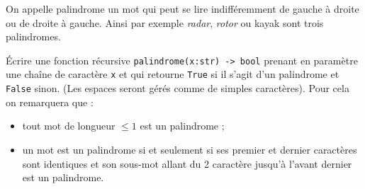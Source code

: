 On appelle palindrome un mot qui peut se lire indifféremment de gauche à droite ou de droite à gauche. Ainsi par exemple \textit{radar}, \textit{rotor} ou kayak sont trois palindromes.

\question{} Écrire une fonction récursive \texttt{palindrome(x:str) -> bool} prenant en paramètre une chaîne de caractère \texttt{x} et qui retourne \texttt{True} si il s'agit d'un palindrome et \texttt{False} sinon. (Les espaces seront gérés comme de simples caractères). Pour cela on remarquera que :
\begin{itemize}
\item tout mot de longueur $\leq 1$ est un palindrome ;
\item un mot est un palindrome si et seulement si ses premier et dernier caractères sont identiques et son sous-mot allant du 2 caractère jusqu'à l'avant dernier est un palindrome.
\end{itemize}


